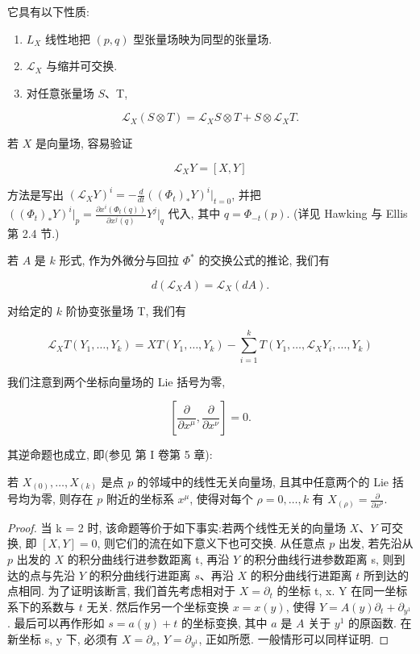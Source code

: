 它具有以下性质:

\begin{enumerate}
\renewcommand{\labelenumi}{\roman{enumi})}
\item $L_{X}$ 线性地把 $(p, q)$ 型张量场映为同型的张量场.
\item $\mathcal{L}_X$ 与缩并可交换.
\item 对任意张量场 $S$、T,
\end{enumerate}

\[
\mathcal{L}_{X}(S \otimes T) = \mathcal{L}_{X}S \otimes T + S \otimes \mathcal{L}_{X}T.
\]

若 $X$ 是向量场, 容易验证

\[
\mathcal{L}_{X}Y = [X, Y]
\]

方法是写出 $(\mathcal{L}_XY)^i = -\frac{d}{dt}((\Phi_t)_*Y)^i\Big|_{t = 0}$, 并把 $((\Phi_t)_*Y)^i\Big|_p = \frac{\partial x^i(\Phi_t(q))}{\partial x^j(q)} Y^j\Big|_q$ 代入, 其中 $q = \Phi_{-t}(p)$. (详见 Hawking 与 Ellis 第 2.4 节.)

若 $A$ 是 $k$ 形式, 作为外微分与回拉 $\Phi^{*}$ 的交换公式的推论, 我们有

\[
d(\mathcal{L}_{X}A) = \mathcal{L}_{X}(dA).
\]

对给定的 $k$ 阶协变张量场 T, 我们有

\[
\mathcal{L}_{X}T(Y_{1}, \dots, Y_{k}) = XT(Y_{1}, \dots, Y_{k}) - \sum_{i=1}^{k} T(Y_{1}, \dots, \mathcal{L}_{X}Y_{i}, \dots, Y_{k})
\]

我们注意到两个坐标向量场的 Lie 括号为零,

\[
\left[\frac{\partial}{\partial x^{\mu}}, \frac{\partial}{\partial x^{\nu}}\right] = 0.
\]

其逆命题也成立, 即(参见 \emph{\cite{sp}} 第 I 卷第 5 章):

\begin{proposition}\label{prop:cA-2.3}
若 $X_{(0)}, \ldots, X_{(k)}$ 是点 $p$ 的邻域中的线性无关向量场, 且其中任意两个的 Lie 括号均为零, 则存在 $p$ 附近的坐标系 $x^{\mu}$, 使得对每个 $\rho = 0, \ldots, k$ 有 $X_{(\rho)} = \frac{\partial}{\partial x^{\rho}}$.
\end{proposition}

\begin{proof}
当 k = 2 时, 该命题等价于如下事实:若两个线性无关的向量场 $X$、$Y$ 可交换, 即 $[X, Y] = 0$, 则它们的流在如下意义下也可交换. 从任意点 $p$ 出发, 若先沿从 $p$ 出发的 $X$ 的积分曲线行进参数距离 t, 再沿 $Y$ 的积分曲线行进参数距离 s, 则到达的点与先沿 $Y$ 的积分曲线行进距离 $s$、再沿 $X$ 的积分曲线行进距离 $t$ 所到达的点相同. 为了证明该断言, 我们首先考虑相对于 $X = \partial_{t}$ 的坐标 t, x. Y 在同一坐标系下的系数与 $t$ 无关. 然后作另一个坐标变换 $x = x(y)$, 使得 $Y = A(y)\partial_{t} + \partial_{y^{1}}$. 最后可以再作形如 $s = a(y) + t$ 的坐标变换, 其中 $a$ 是 $A$ 关于 $y^{1}$ 的原函数. 在新坐标 s, y 下, 必须有 $X = \partial_{s}$, $Y = \partial_{y^{1}}$, 正如所愿. 一般情形可以同样证明.
\end{proof}

